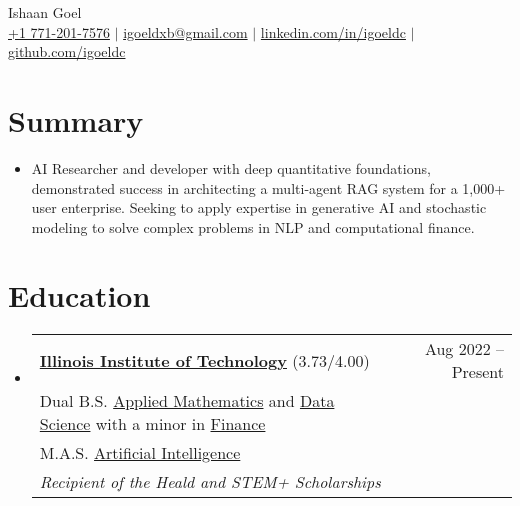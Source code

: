 \documentclass[letterpaper,10pt]{article}
\newcommand\indentsize{10pt}
\newcommand{\resumeSubHeadingListStart}{\begin{itemize}[leftmargin=0.15in, label=]}
\newcommand{\resumeSubHeadingListEnd}{\end{itemize}}
\begin{document}
\begin{center}
    \Huge Ishaan Goel \\ \vspace{2pt}
    \large
    \href{tel:17712017576}{+1 771-201-7576}
    $|$ \href{mailto:igoeldxb@gmail.com}{igoeldxb@gmail.com}
    $|$ \href{https://linkedin.com/in/igoeldc/}{linkedin.com/in/igoeldc}
    $|$ \href{https://github.com/igoeldc}{github.com/igoeldc}
\end{center}

\section{Summary}
  \resumeSubHeadingListStart
    \item{AI Researcher and developer with deep quantitative foundations, demonstrated success in architecting a multi-agent RAG system for a 1,000+ user enterprise. Seeking to apply expertise in generative AI and stochastic modeling to solve complex problems in NLP and computational finance.}
  \resumeSubHeadingListEnd
\vspace{-10pt}

\newcommand{\resumeEducationHeading}[6]{
  \item
    \begin{tabular*}{0.97\textwidth}[t]{l@{\extracolsep{\fill}}r}
      \textbf{#1} {#2} & #3 \\
      \hspace{\indentsize} #4 \\
      \hspace{\indentsize} #5 \\
      \hspace{20pt} \textit{#6} \\
    \end{tabular*}
}

\section{Education}
  \resumeSubHeadingListStart
    \resumeEducationHeading
      {\href{https://www.iit.edu/}{Illinois Institute of Technology}}{(3.73/4.00)}{Aug 2022 -- Present}{Dual B.S. \href{https://catalog.iit.edu/undergraduate/colleges/computing/applied-mathematics/bs/\#text}{Applied Mathematics} and \href{https://catalog.iit.edu/undergraduate/colleges/computing/computer-science/\#:~:text=The\%20B.S.\%20in\%20Data,be\%20successful\%20data\%20science\%20professionals.}{Data Science} with a minor in \href{https://catalog.iit.edu/undergraduate/colleges/business/minor-finance/\#:~:text=business\%20schools\%20worldwide.-,Required\%20Courses,-Course\%20List}{Finance}}
      {M.A.S. \href{https://catalog.iit.edu/graduate/colleges/computing/computer-science/master-artificial-intelligence/\#overviewtext}{Artificial Intelligence}}{Recipient of the Heald and STEM+ Scholarships}
  \resumeSubHeadingListEnd
  
\end{document}
